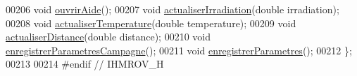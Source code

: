\begin{DoxyCode}
00206     \textcolor{keywordtype}{void} \hyperlink{class_i_h_m_rov_a45a10161fde8c6373918ec30f16a8b5e}{ouvrirAide}();
00207     \textcolor{keywordtype}{void} \hyperlink{class_i_h_m_rov_a9a5108ce8f73fad9a38d02881ec5ae62}{actualiserIrradiation}(\textcolor{keywordtype}{double} irradiation);
00208     \textcolor{keywordtype}{void} \hyperlink{class_i_h_m_rov_ae5f2c89b06d7dc09e9974428b14799f1}{actualiserTemperature}(\textcolor{keywordtype}{double} temperature);
00209     \textcolor{keywordtype}{void} \hyperlink{class_i_h_m_rov_a891d51cf532d9cc8fc56c63a0c61e663}{actualiserDistance}(\textcolor{keywordtype}{double} distance);
00210     \textcolor{keywordtype}{void} \hyperlink{class_i_h_m_rov_a229194814bfb1fc94ab3cc86d6411921}{enregistrerParametresCampagne}();
00211     \textcolor{keywordtype}{void} \hyperlink{class_i_h_m_rov_a94d31f4e748f3e4549eab42c8bc7e367}{enregistrerParametres}();
00212 \};
00213 
00214 \textcolor{preprocessor}{#endif // IHMROV\_H}
\end{DoxyCode}
